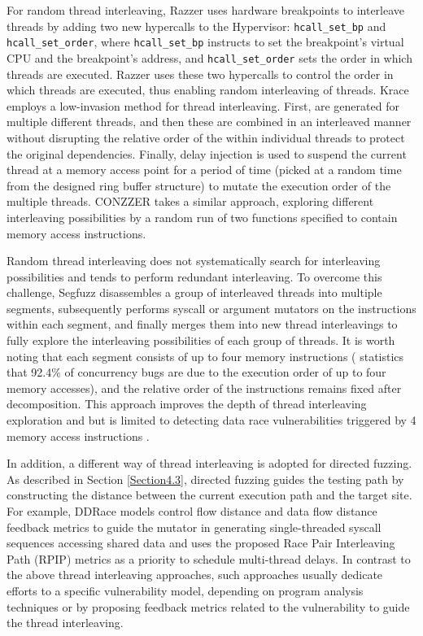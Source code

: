 For random thread interleaving, Razzer \cite{jeong2019razzer} uses hardware breakpoints to interleave threads by adding two new hypercalls to the Hypervisor: \texttt{hcall\_set\_bp} and \texttt{hcall\_set\_order}, where \texttt{hcall\_set\_bp} instructs to set the breakpoint's virtual CPU and the breakpoint's address, and \texttt{hcall\_set\_order} sets the order in which threads are executed. Razzer uses these two hypercalls to control the order in which threads are executed, thus enabling random interleaving of threads. Krace \cite{xu2020krace} employs a low-invasion method for thread interleaving. First,  are generated for multiple different threads, and then these  are combined in an interleaved manner without disrupting the relative order of the  within individual threads to protect the original dependencies. Finally, delay injection is used to suspend the current thread at a memory access point for a period of time (picked at a random time from the designed ring buffer structure) to mutate the execution order of the multiple threads. CONZZER \cite{CONZZER2022context} takes a similar approach, exploring different interleaving possibilities by a random run of two functions specified to contain memory access instructions.

Random thread interleaving does not systematically search for interleaving possibilities and tends to perform redundant interleaving. To overcome this challenge, Segfuzz \cite{jeong2023segfuzz} disassembles a group of interleaved threads into multiple segments, subsequently performs syscall or argument mutators on the instructions within each segment, and finally merges them into new thread interleavings to fully explore the interleaving possibilities of each group of threads. It is worth noting that each segment consists of up to four memory instructions (\cite{Lu2008LearningFM} statistics that 92.4\% of concurrency bugs are due to the execution order of up to four memory accesses), and the relative order of the instructions remains fixed after decomposition. This approach improves the depth of thread interleaving exploration and but is limited to detecting data race vulnerabilities triggered by 4 memory access instructions \cite{Lu2008LearningFM}.

In addition, a different way of thread interleaving is adopted for directed fuzzing. As described in Section \ref{Section4.3}, directed fuzzing guides the testing path by constructing the distance between the current execution path and the target site. For example, DDRace \cite{Yuan2023DDRace} models control flow distance and data flow distance feedback metrics to guide the mutator in generating single-threaded syscall sequences accessing shared data and uses the proposed Race Pair Interleaving Path (RPIP) metrics as a priority to schedule multi-thread delays. In contrast to the above thread interleaving approaches, such approaches usually dedicate efforts to a specific vulnerability model, depending on program analysis techniques or by proposing feedback metrics related to the vulnerability to guide the thread interleaving.


